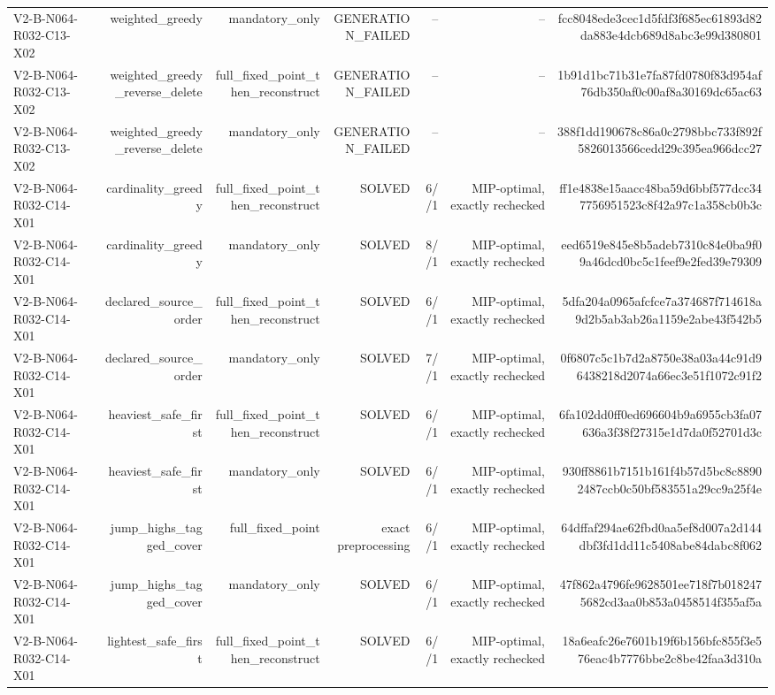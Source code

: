 {\begin{longtable}{lrrrrrr}
V2-B-N064-R032-C13-X02 & weighted\_greedy & mandatory\_only & GENERATION\_FAILED & -- & -- & fcc8048ede3cec1d5fdf3f685ec61893d82da883e4dcb689d8abc3e99d380801 \\
V2-B-N064-R032-C13-X02 & weighted\_greedy\_reverse\_delete & full\_fixed\_point\_then\_reconstruct & GENERATION\_FAILED & -- & -- & 1b91d1bc71b31e7fa87fd0780f83d954af76db350af0c00af8a30169dc65ac63 \\
V2-B-N064-R032-C13-X02 & weighted\_greedy\_reverse\_delete & mandatory\_only & GENERATION\_FAILED & -- & -- & 388f1dd190678c86a0c2798bbc733f892f5826013566cedd29c395ea966dcc27 \\
V2-B-N064-R032-C14-X01 & cardinality\_greedy & full\_fixed\_point\_then\_reconstruct & SOLVED & 6//1 & MIP-optimal, exactly rechecked & ff1e4838e15aacc48ba59d6bbf577dcc347756951523c8f42a97c1a358cb0b3c \\
V2-B-N064-R032-C14-X01 & cardinality\_greedy & mandatory\_only & SOLVED & 8//1 & MIP-optimal, exactly rechecked & eed6519e845e8b5adeb7310c84e0ba9f09a46dcd0bc5c1feef9e2fed39e79309 \\
V2-B-N064-R032-C14-X01 & declared\_source\_order & full\_fixed\_point\_then\_reconstruct & SOLVED & 6//1 & MIP-optimal, exactly rechecked & 5dfa204a0965afcfce7a374687f714618a9d2b5ab3ab26a1159e2abe43f542b5 \\
V2-B-N064-R032-C14-X01 & declared\_source\_order & mandatory\_only & SOLVED & 7//1 & MIP-optimal, exactly rechecked & 0f6807c5c1b7d2a8750e38a03a44c91d96438218d2074a66ec3e51f1072c91f2 \\
V2-B-N064-R032-C14-X01 & heaviest\_safe\_first & full\_fixed\_point\_then\_reconstruct & SOLVED & 6//1 & MIP-optimal, exactly rechecked & 6fa102dd0ff0ed696604b9a6955cb3fa07636a3f38f27315e1d7da0f52701d3c \\
V2-B-N064-R032-C14-X01 & heaviest\_safe\_first & mandatory\_only & SOLVED & 6//1 & MIP-optimal, exactly rechecked & 930ff8861b7151b161f4b57d5bc8c88902487ccb0c50bf583551a29cc9a25f4e \\
V2-B-N064-R032-C14-X01 & jump\_highs\_tagged\_cover & full\_fixed\_point & exact preprocessing & 6//1 & MIP-optimal, exactly rechecked & 64dffaf294ae62fbd0aa5ef8d007a2d144dbf3fd1dd11c5408abe84dabc8f062 \\
V2-B-N064-R032-C14-X01 & jump\_highs\_tagged\_cover & mandatory\_only & SOLVED & 6//1 & MIP-optimal, exactly rechecked & 47f862a4796fe9628501ee718f7b0182475682cd3aa0b853a0458514f355af5a \\
V2-B-N064-R032-C14-X01 & lightest\_safe\_first & full\_fixed\_point\_then\_reconstruct & SOLVED & 6//1 & MIP-optimal, exactly rechecked & 18a6eafc26e7601b19f6b156bfc855f3e576eac4b7776bbe2c8be42faa3d310a \\

\end{longtable}}
